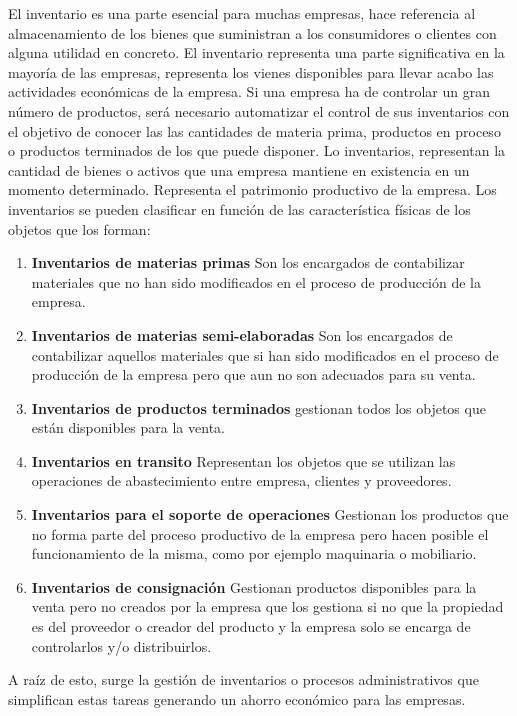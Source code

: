 \documentclass[a4paper,11pt]{book}
\begin{document}
El inventario\cite{libro} es una parte esencial para muchas empresas, hace referencia al almacenamiento de los bienes que suministran a los consumidores o clientes con alguna utilidad en concreto. El inventario representa una parte significativa en la mayoría de las empresas, representa los vienes disponibles para llevar acabo las actividades económicas de la empresa.  Si una empresa ha de controlar un gran número de productos, será necesario automatizar el control de sus inventarios con el objetivo de conocer las las cantidades de materia prima, productos en proceso o productos terminados de los que puede disponer.  Lo inventarios, representan la cantidad de bienes o activos que una empresa mantiene en existencia en un momento determinado. Representa el patrimonio productivo de la empresa. Los inventarios se pueden clasificar en función de las característica físicas de los objetos que los forman: 

\begin{enumerate}
\item \textbf{Inventarios de materias primas} Son los encargados de contabilizar materiales que no han sido modificados en el proceso de producción de la empresa.
\item \textbf{Inventarios de materias semi-elaboradas} Son los encargados de contabilizar aquellos materiales que si han sido modificados en el proceso de producción de la empresa pero que aun no son adecuados para su venta.
\item \textbf{Inventarios de productos terminados} gestionan todos los objetos que están disponibles para la venta.
\item \textbf{Inventarios en transito} Representan los objetos que se utilizan las operaciones de abastecimiento entre empresa, clientes y proveedores.
\item \textbf{Inventarios para el soporte de operaciones} Gestionan los productos que no forma parte del proceso productivo de la empresa pero hacen posible el funcionamiento de la misma, como por ejemplo maquinaria o mobiliario.
\item \textbf{Inventarios de consignación} Gestionan productos disponibles para la venta pero no creados por la empresa que los gestiona si no que la propiedad es del proveedor o creador del producto y la empresa solo se encarga de controlarlos y/o distribuirlos.
\end{enumerate}
 

A raíz de esto, surge la gestión de inventarios o procesos administrativos que simplifican estas tareas generando un ahorro económico para las empresas. 
\end{document}
